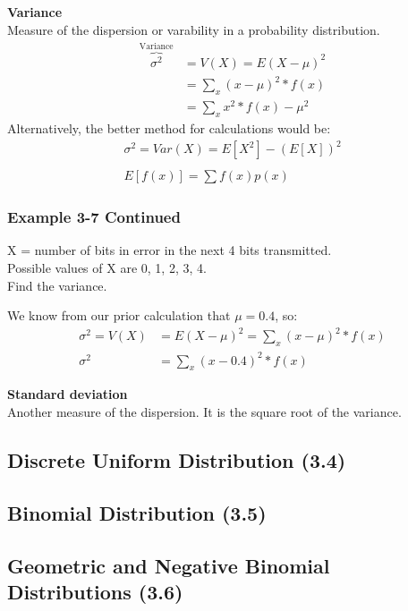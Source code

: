 \documentclass[../INDE315.tex]{subfiles}
\begin{document}
\begin{defn}
    \textbf{Variance} \\
    Measure of the dispersion or varability in a probability distribution.
    \begin{equation*}
        \begin{aligned}
            \overbrace{\sigma ^2}^{\text{Variance}} &= V(X) = E(X - \mu)^2 \\
                                                &= \sum_x (x- \mu)^2 * f(x) \\
                                                &= \sum_x x^2 * f(x) - \mu ^2 
        \end{aligned}
    \end{equation*}
    Alternatively, the better method for calculations would be:
    \begin{equation*}
        \begin{aligned}
            \sigma ^2 =  Var(X) = E[X^2] - (E[X])^2 \\
            \\
            E[f(x)] = \sum f(x) p(x) 
        \end{aligned}
    \end{equation*}
\end{defn}

\subsubsection*{Example 3-7 Continued}
\begin{exmp}
    X = number of bits in error in the next 4 bits transmitted. \\
    Possible values of X are {0, 1, 2, 3, 4}. \\
    Find the variance.
\end{exmp}
We know from our prior calculation that $\mu = 0.4$, so:
\begin{equation*}
    \begin{aligned}
        \sigma ^2 = V(X) &= E(X - \mu)^2 = \sum_x (x - \mu)^2 * f(x) \\
        \sigma ^2        &= \sum_x (x - 0.4)^2 * f(x)
    \end{aligned}
\end{equation*} 




\begin{defn}
    \textbf{Standard deviation} \\
    Another measure of the dispersion. It is the square root of the variance.
\end{defn}


\subsection*{Discrete Uniform Distribution (3.4)}
\subsection*{Binomial Distribution (3.5)}
\subsection*{Geometric and Negative Binomial Distributions (3.6)}
\end{document}
